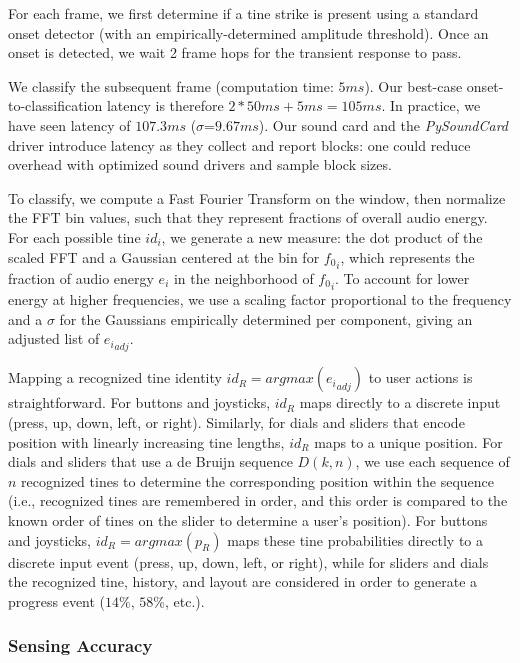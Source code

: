     For each frame, we first determine if a tine strike is present using a standard onset detector (with an empirically-determined amplitude threshold). Once an onset is detected, we wait 2 frame hops for the transient response to pass.
    
    We classify the subsequent frame (computation time: $5ms$). Our best-case onset-to-classification latency is therefore $2 * 50ms + 5ms = 105ms$. In practice, we have seen latency of $107.3ms$ ($\sigma$=$9.67ms$). Our sound card and the \emph{PySoundCard} driver introduce latency as they collect and report blocks: one could reduce overhead with optimized sound drivers and sample block sizes.

    To classify, we compute a Fast Fourier Transform on the window, then normalize the FFT bin values, such that they represent fractions of overall audio energy. For each possible tine $id_i$, we generate a new measure: the dot product of the scaled FFT and a Gaussian centered at the bin for ${f_0}_i$, which represents the fraction of audio energy $e_i$ in the neighborhood of ${f_0}_i$. To account for lower energy at higher frequencies, we use a scaling factor proportional to the frequency and a $\sigma$ for the Gaussians empirically determined per component, giving an adjusted list of ${e_i}_{adj}$. 

    Mapping a recognized tine identity $id_R=argmax({e_i}_{adj})$ to user actions is straightforward. For buttons and joysticks, $id_R$ maps directly to a discrete input (press, up, down, left, or right). Similarly, for dials and sliders that encode position with linearly increasing tine lengths, $id_R$ maps to a unique position. For dials and sliders that use a de Bruijn sequence $D(k, n)$, we use each sequence of $n$ recognized tines to determine the corresponding position within the sequence (i.e., recognized tines are remembered in order, and this order is compared to the known order of tines on the slider to determine a user's position). For buttons and joysticks, $id_R=argmax(p_R)$ maps these tine probabilities directly to a discrete input event (press, up, down, left, or right), while for sliders and dials the recognized tine, history, and layout are considered in order to generate a progress event ($14\%$, $58\%$, etc.).
    
    \subsubsection{Sensing Accuracy}
    
